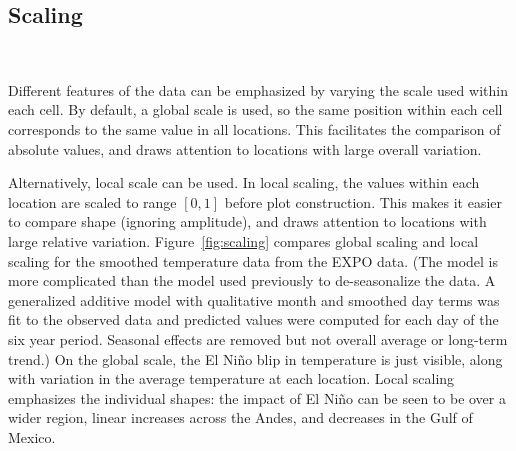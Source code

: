 \documentclass[oneside]{article}
\begin{document}




\subsection{Scaling}~\label{sec:scale}


Different features of the data can be emphasized by varying the scale used within each cell. By default, a global scale is used, so the same position within each cell corresponds to the same value in all locations. This facilitates the comparison of absolute values, and draws attention to locations with large overall variation.

Alternatively, local scale can be used. In local scaling, the values within each location are scaled to range $[0, 1]$ before plot construction. This makes it easier to compare shape (ignoring amplitude), and draws attention to locations with large relative variation. Figure~\ref{fig:scaling} compares global scaling and local scaling for the smoothed temperature data from the EXPO data. (The model is more complicated than the model used previously to de-seasonalize the data. A generalized additive model \citep{wood:2006} with qualitative month and smoothed day terms was fit to the observed data and predicted values were computed for each day of the six year period. Seasonal effects are removed but not overall average or long-term trend.) On the global scale, the El Ni\~no blip in temperature is just visible, along with variation in the average temperature at each location. Local scaling emphasizes the individual shapes: the impact of El Ni\~no can be seen to be over a wider region, linear increases across the Andes, and decreases in the Gulf of Mexico.
\end{document}
